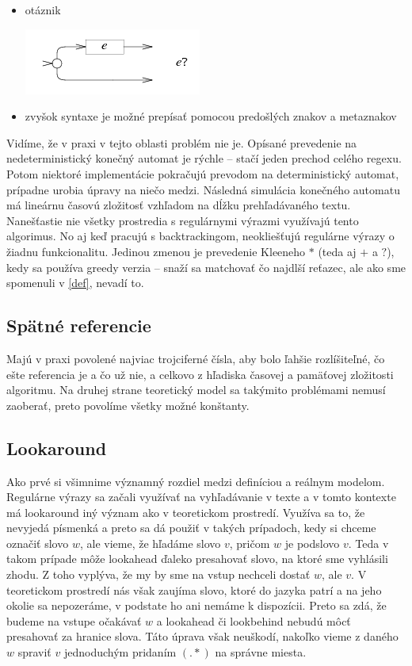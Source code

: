 \begin{itemize}
\begin{center}
\end{center}
\item otáznik
\begin{center}
    \includegraphics[scale=1]{obrazky/T_otaznik}
\end{center}
\item zvyšok syntaxe je možné prepísať pomocou predošlých znakov a metaznakov
\end{itemize}

Vidíme, že v praxi v tejto oblasti problém nie je. Opísané prevedenie na nedeterministický konečný automat je rýchle -- stačí jeden prechod celého regexu. Potom niektoré implementácie pokračujú prevodom na deterministický automat, prípadne urobia úpravy na niečo medzi. Nás\-led\-ná simulácia konečného automatu má lineárnu časovú zložitosť vzhľadom na dĺžku prehľadávaného textu\cite{ExtendedRegexPower}. Nanešťastie nie všetky prostredia s regulárnymi výrazmi využívajú tento algorimus. No aj keď pracujú s backtrackingom, neokliešťujú regulárne výrazy o žiadnu funkcionalitu. Jedinou zmenou je prevedenie Kleeneho $*$ (teda aj $+$ a $?$), kedy sa používa greedy verzia -- snaží sa matchovať čo najdlší reťazec, ale ako sme spomenuli v \ref{def}, nevadí to.

\subsection*{Spätné referencie}
\label{praxbackref}

Majú v praxi povolené najviac trojciferné čísla\cite{Python3Documentation}, aby bolo ľahšie rozlíšiteľné, čo ešte referencia je a čo už nie, a celkovo z hľadiska časovej a pamäťovej zložitosti algoritmu. Na druhej strane teoretický model sa takýmito problémami nemusí zaoberať, preto povolíme všetky možné konštanty.

\subsection*{Lookaround}
\label{praxla}

Ako prvé si všimnime významný rozdiel medzi definíciou a reálnym modelom. Re\-gu\-lár\-ne výrazy sa začali využívať na vyhľadávanie v texte a v tomto kontexte má lookaround iný význam ako v teoretickom prostredí. Využíva sa to, že nevyjedá písmenká a preto sa dá použiť v takých prípadoch, kedy si chceme označiť slovo $w$, ale vieme, že hľadáme slovo $v$, pričom $w$ je podslovo $v$. Teda v takom prípade môže look\-ahead ďaleko presahovať slovo, na ktoré sme vyhlásili zhodu. Z toho vyplýva, že my by sme na vstup nechceli dostať $w$, ale $v$. V teoretickom prostredí nás však zaujíma slovo, ktoré do jazyka patrí a na jeho okolie sa nepozeráme, v podstate ho ani nemáme k dispozícii. Preto sa zdá, že budeme na vstupe očakávať $w$ a lookahead či lookbehind nebudú môcť presahovať za hranice slova. Táto úprava však neuškodí, nakoľko vieme z daného $w$ spraviť $v$ jednoduchým pridaním $(.*)$ na správne miesta.


